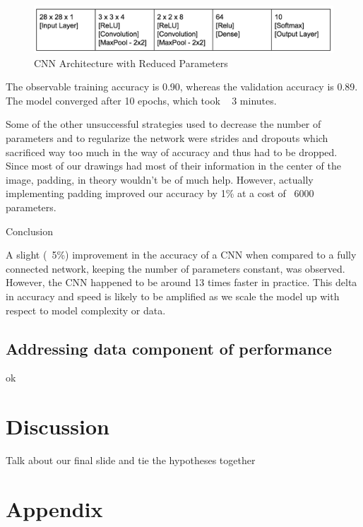 \documentclass[12pt]{article}
\begin{document}
\begin{figure}
  \begin{center}
    \includegraphics[scale=0.5]{fig4}
  \end{center}
  \caption{CNN Architecture with Reduced Parameters}
  \label{fig:cnnArchPool}
\end{figure}

The observable training accuracy is 0.90, whereas the validation accuracy is
0.89. The model converged after 10 epochs, which took ~ 3 minutes.

Some of the other unsuccessful strategies used to decrease the number of
parameters and to regularize the network were strides and dropouts which
sacrificed way too much in the way of accuracy and thus had to be dropped.
Since most of our drawings had most of their information in the center of the
image, padding, in theory wouldn’t be of much help. However, actually
implementing padding improved our accuracy by 1\% at a cost of ~6000
parameters.

Conclusion

A slight (~5\%) improvement in the accuracy of a CNN when compared to a fully connected network, keeping the number of parameters constant, was observed. However, the CNN happened to be around 13 times faster in practice. This delta in accuracy and speed is likely to be amplified as we scale the model up with respect to model complexity or data.

\subsection{Addressing data component of performance}

ok

\section{Discussion}

Talk about our final slide and tie the hypotheses together




\section{Appendix}
\end{document}
